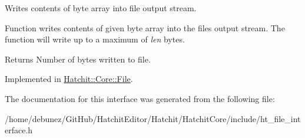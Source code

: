 Writes contents of byte array into file output stream. 

Function writes contents of given byte array into the file\textquotesingle{}s output stream. The function will write up to a maximum of {\itshape len} bytes. \begin{DoxyReturn}{Returns}
Number of bytes written to file. 
\end{DoxyReturn}


Implemented in \hyperlink{classHatchit_1_1Core_1_1File_adca0370e5faf5e22b6b4c5993ae71e5d}{Hatchit\+::\+Core\+::\+File}.



The documentation for this interface was generated from the following file\+:\begin{DoxyCompactItemize}
\item 
/home/debunez/\+Git\+Hub/\+Hatchit\+Editor/\+Hatchit/\+Hatchit\+Core/include/ht\+\_\+file\+\_\+interface.\+h\end{DoxyCompactItemize}
